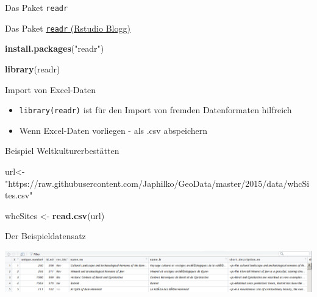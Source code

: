 \documentclass[ignorenonframetext,]{beamer}
\newenvironment{Shaded}{}{}
\newcommand{\KeywordTok}[1]{\textcolor[rgb]{0.00,0.44,0.13}{\textbf{{#1}}}}
\newcommand{\StringTok}[1]{\textcolor[rgb]{0.25,0.44,0.63}{{#1}}}
\newcommand{\NormalTok}[1]{{#1}}
\providecommand{\tightlist}{%
\setlength{\itemsep}{0pt}\setlength{\parskip}{0pt}}
\begin{document}
\begin{frame}[fragile]{Das Paket \texttt{readr}}

\begin{block}{Das Paket
\href{https://blog.rstudio.org/2015/10/28/readr-0-2-0/}{\texttt{readr}
(Rstudio Blogg)}}

\begin{Shaded}
\begin{Highlighting}[]
\KeywordTok{install.packages}\NormalTok{(}\StringTok{"readr"}\NormalTok{)}
\end{Highlighting}
\end{Shaded}

\begin{Shaded}
\begin{Highlighting}[]
\KeywordTok{library}\NormalTok{(readr)}
\end{Highlighting}
\end{Shaded}

\end{block}

\end{frame}

\begin{frame}[fragile]{Import von Excel-Daten}

\begin{itemize}
\tightlist
\item
  \texttt{library(readr)} ist für den Import von fremden Datenformaten
  hilfreich
\item
  Wenn Excel-Daten vorliegen - als .csv abspeichern
\end{itemize}

\begin{block}{Beispiel Weltkulturerbestätten}

\begin{Shaded}
\begin{Highlighting}[]
\NormalTok{url<-}\StringTok{"https://raw.githubusercontent.com/Japhilko/GeoData/master/2015/data/whcSites.csv"}

\NormalTok{whcSites <-}\StringTok{ }\KeywordTok{read.csv}\NormalTok{(url) }
\end{Highlighting}
\end{Shaded}

\end{block}

\end{frame}

\begin{frame}{Der Beispieldatensatz}

\includegraphics{./tex2pdf.956/2660e2345e9e67c6183dba09dc92fe1b26a231dc.png}

\end{frame}
\end{document}
